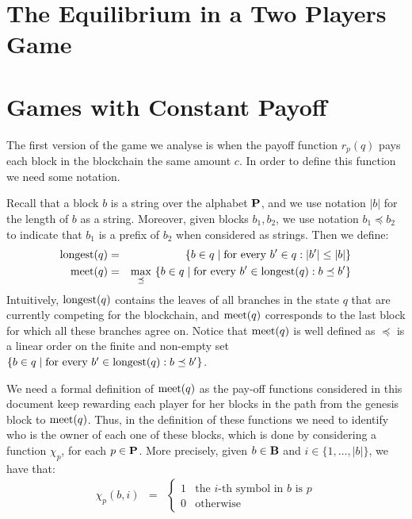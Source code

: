 
\section{The Equilibrium in a Two Players Game}
\label{sec-twoplayers}

\section{Games with Constant Payoff}

The first version of the game we analyse is when the payoff function $r_p(q)$ pays each block in the blockchain the same amount $c$. In order to define this function we need 
some notation. 

Recall that a block $b$ is a string over the alphabet $\mathbf{P}$, and we use notation $|b|$ for the length of $b$ as a string. Moreover, given blocks $b_1, b_2$, we use notation $b_1 \preceq b_2$ to indicate that $b_1$ is a prefix of $b_2$  when considered as strings. Then we define: 
\begin{eqnarray*}
{\text{\rm longest}}(q) & = & \{ b \in q \mid \text{for every } b' \in q: |b'| \leq |b|\}\\
\text{\rm meet}(q) & = & {\displaystyle \max_{\preceq} \ \{b \in q \mid \text{for every } b' \in {\text{\rm longest}}(q): b \preceq b'\}}
\end{eqnarray*}
Intuitively, ${\text{\rm longest}}(q)$ contains the leaves of all branches in the state $q$ that are currently competing for the blockchain, and $\text{\rm meet}(q)$ corresponds to the last block for which all these branches agree on. Notice that $\text{\rm meet}(q)$ is well defined as $\preceq$ is a linear order on the finite and non-empty set $\{b \in q \mid \text{for every } b' \in {\text{\rm longest}}(q): b \preceq b'\}$.

We need a formal definition of $\text{\rm meet}(q)$ as the pay-off functions considered in this document keep rewarding each player for her blocks in the path from the genesis block to $\text{\rm meet}(q)$. Thus, in the definition of these functions we need to identify who is the owner of each one of these blocks, which is done by considering a function $\chi_p$, for each $p \in \mathbf{P}$. More precisely, given $b \in \mathbf{B}$ and $i \in \{1, \ldots, |b|\}$, we have that:
\begin{eqnarray*}
\chi_p(b,i) & = & 
\begin{cases}
1 & \text{the } i\text{-th symbol in } b \text{ is } p\\
0 & \text{otherwise}
\end{cases}
\end{eqnarray*}

